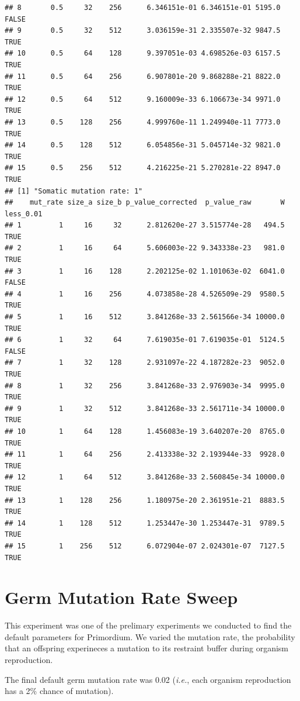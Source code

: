 \documentclass[]{book}
\begin{document}
\begin{verbatim}
## 8       0.5     32    256      6.346151e-01 6.346151e-01 5195.0     FALSE
## 9       0.5     32    512      3.036159e-31 2.335507e-32 9847.5      TRUE
## 10      0.5     64    128      9.397051e-03 4.698526e-03 6157.5      TRUE
## 11      0.5     64    256      6.907801e-20 9.868288e-21 8822.0      TRUE
## 12      0.5     64    512      9.160009e-33 6.106673e-34 9971.0      TRUE
## 13      0.5    128    256      4.999760e-11 1.249940e-11 7773.0      TRUE
## 14      0.5    128    512      6.054856e-31 5.045714e-32 9821.0      TRUE
## 15      0.5    256    512      4.216225e-21 5.270281e-22 8947.0      TRUE
## [1] "Somatic mutation rate: 1"
##    mut_rate size_a size_b p_value_corrected  p_value_raw       W less_0.01
## 1         1     16     32      2.812620e-27 3.515774e-28   494.5      TRUE
## 2         1     16     64      5.606003e-22 9.343338e-23   981.0      TRUE
## 3         1     16    128      2.202125e-02 1.101063e-02  6041.0     FALSE
## 4         1     16    256      4.073858e-28 4.526509e-29  9580.5      TRUE
## 5         1     16    512      3.841268e-33 2.561566e-34 10000.0      TRUE
## 6         1     32     64      7.619035e-01 7.619035e-01  5124.5     FALSE
## 7         1     32    128      2.931097e-22 4.187282e-23  9052.0      TRUE
## 8         1     32    256      3.841268e-33 2.976903e-34  9995.0      TRUE
## 9         1     32    512      3.841268e-33 2.561711e-34 10000.0      TRUE
## 10        1     64    128      1.456083e-19 3.640207e-20  8765.0      TRUE
## 11        1     64    256      2.413338e-32 2.193944e-33  9928.0      TRUE
## 12        1     64    512      3.841268e-33 2.560845e-34 10000.0      TRUE
## 13        1    128    256      1.180975e-20 2.361951e-21  8883.5      TRUE
## 14        1    128    512      1.253447e-30 1.253447e-31  9789.5      TRUE
## 15        1    256    512      6.072904e-07 2.024301e-07  7127.5      TRUE
\end{verbatim}

\hypertarget{germ-mutation-rate-sweep}{%
\chapter{Germ Mutation Rate Sweep}\label{germ-mutation-rate-sweep}}

This experiment was one of the prelimary experiments we conducted to find the default parameters for Primordium.
We varied the mutation rate, the probability that an offspring experineces a mutation to its restraint buffer during organism reproduction.

The final default germ mutation rate was 0.02 (\emph{i.e.}, each organism reproduction has a 2\% chance of mutation).
\end{document}
